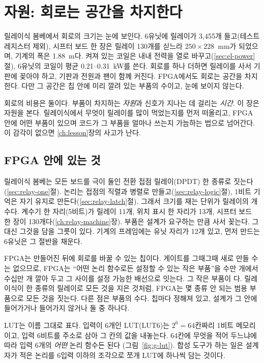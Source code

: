 \chapter{자원: 회로는 공간을 차지한다}\label{ch:resources}

릴레이식 봄베에서 회로의 크기는 눈에 보인다. 6유닛에 릴레이가 3,455개 들고(테스트 레지스터 제외), 시프터 보드
한 장은 릴레이 130개를 싣느라 $250 \times 228$~mm가 되었으며, 기계의 폭은 1.88~m다. 켜져 있는 코일은 내내
전력을 열로 바꾸고(\ref{sec:el-power}절), 6유닛의 코일이 평균 0.21--0.31~kW를 쓴다. 회로를 하나 더하면 릴레이를 사서 기판에 꽂아야 하고,
기판과 전원과 팬이 함께 커진다. FPGA에서도 회로는 공간을 차지한다. 다만 그 공간은 칩 안에 미리 깔려 있는
부품의 수이고, 눈에 보이지 않는다.

회로의 비용은 둘이다. 부품이 차지하는 \emph{자원}과 신호가 지나는 데 걸리는 \emph{시간}. 이 장은 자원을 본다.
릴레이식에서 무엇이 릴레이를 많이 먹었는지를 먼저 떠올리고, FPGA 안에 어떤 부품이 있으며 코드가 그 부품을
얼마나 쓰는지 가늠하는 법으로 넘어간다. 이 감각이 없으면 \ref{ch:lesson}장의 사고가 난다.

\section{FPGA 안에 있는 것}

\Relay 릴레이식 봄베는 모든 보드를 극이 둘인 전환 접점 릴레이(DPDT) 한 종류로 짓는다(\ref{sec:relay-one}절).
논리는 접점의 직렬과 병렬로 만들고(\ref{sec:relay-logic}절), 1비트 기억은 자기 유지로 만든다(\ref{sec:relay-latch}절).
그래서 크기를 재는 단위가 릴레이의 개수다. 계수기 한 자리(5비트)가 릴레이 11개, 위치 표시 한 자리가 13개, 시프터
보드 한 장이 130개다(\ref{ch:relay-machine}장). 부품은 설계가 요구하는 만큼 사서 꽂는다. 그 대신 그것을 담을
그릇이 있다. 기계의 프레임에는 유닛 자리가 12개 있고, 먼저 만드는 6유닛은 그 절반을 채운다.

\Why FPGA는 만들어진 뒤에 회로를 바꿀 수 있는 칩이다. 게이트를 그때그때 새로 만들 수는 없으므로,
FPGA는 ``어떤 논리 함수로든 설정할 수 있는 작은 부품''을 수만 개에서 수십만 개 깔아 두고 그 사이를
설정 가능한 배선으로 잇는다. 그 작은 부품이 다. 릴레이식이 한 종류의 릴레이로
모든 것을 지은 것처럼, FPGA는 몇 종류 안 되는 범용 부품으로 모든 것을 짓는다. 다른 점은 부품의 수다. 칩마다
정해져 있고, 설계가 그 안에 들어가거나 들어가지 않거나 둘 중 하나다.

LUT는 이름 그대로 표다. 입력이 6개인 LUT(LUT6)는 $2^6 = 64$칸짜리 1비트 메모리이고, 입력 6비트를 주소로
삼아 그 칸의 값을 내놓는다. 64칸에 무엇을 적어 두느냐에 따라 입력 6개의 \emph{어떤} 논리 함수든 된다
(그림~\ref{fig:g-lut}). 합성 도구가 하는 일은 설계자가 적은 논리를 6입력 이하의 조각으로 쪼개 LUT에
하나씩 담는 것이다.

